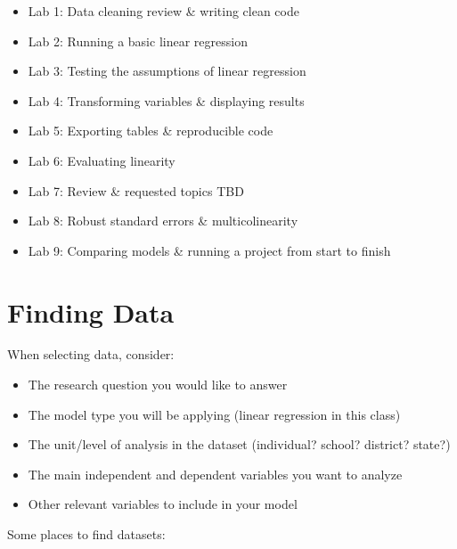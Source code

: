 \documentclass[
]{book}
\providecommand{\tightlist}{%
  \setlength{\itemsep}{0pt}\setlength{\parskip}{0pt}}
\begin{document}
\begin{itemize}
\tightlist
\item
  Lab 1: Data cleaning review \& writing clean code
\item
  Lab 2: Running a basic linear regression
\item
  Lab 3: Testing the assumptions of linear regression\\
\item
  Lab 4: Transforming variables \& displaying results
\item
  Lab 5: Exporting tables \& reproducible code
\item
  Lab 6: Evaluating linearity
\item
  Lab 7: Review \& requested topics TBD
\item
  Lab 8: Robust standard errors \& multicolinearity
\item
  Lab 9: Comparing models \& running a project from start to finish
\end{itemize}

\hypertarget{finding-data}{%
\section{Finding Data}\label{finding-data}}

When selecting data, consider:

\begin{itemize}
\tightlist
\item
  The research question you would like to answer
\item
  The model type you will be applying (linear regression in this class)
\item
  The unit/level of analysis in the dataset (individual? school? district? state?)
\item
  The main independent and dependent variables you want to analyze
\item
  Other relevant variables to include in your model
\end{itemize}

Some places to find datasets:
\end{document}
